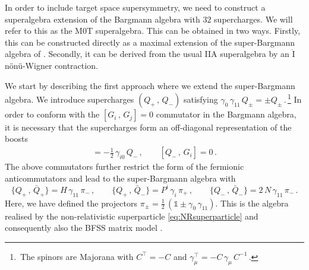 \documentclass[11pt]{article}
\newcommand{\be}{\begin{equation}}
\newcommand{\ee}{\end{equation}}
\begin{document}
In order to include target space supersymmetry, we need to construct a superalgebra extension of the Bargmann algebra with $32$ supercharges. We will refer to this as the M0T superalgebra.
This can be obtained in two ways.
Firstly, this can be constructed directly as a maximal extension of the super-Bargmann algebra of \cite{Gomis:2004pw}. 
Secondly, it can be derived from the usual IIA superalgebra by an $\dot{\text{I}}$n\"on\"u-Wigner contraction.

We start by describing the first approach where we extend the super-Bargmann algebra.
We introduce supercharges $(Q^{}_+\,, \, Q^{}_-)$ satisfying $\gamma^{}_0 \, \gamma^{}_{11} \, Q^{}_\pm = \pm Q^{}_\pm$\,.\,\footnote{\,The spinors are Majorana with $C^\intercal = -C$ and $\gamma_\mu^\intercal = -C \, \gamma^{}_\mu \, C^{-1}$\,. }
In order to conform with the $[G^{}_i\,, \, G^{}_j]=0$ commutator in the Bargmann algebra, it is necessary that the supercharges form an off-diagonal representation of the boosts
%
\begin{align}
    [Q^{}_+\,, \, G^{}_i] = -\tfrac{1}{2} \, \gamma^{}_{i0} \, Q^{}_-\,, 
        \qquad%
    [Q^{}_-\,, \, G^{}_i] = 0\,.
\end{align}
%
The above commutators further restrict the form of the fermionic anticommutators and lead to the super-Bargmann algebra with 
%
\be
    \{Q_+\,, \, \bar{Q}_+\} = H \, \gamma^{}_{11} \, \pi^{}_-\,, 
        \qquad%
    \{Q_+\,, \, \bar{Q}_-\} = P^i \, \gamma^{}_i \, \pi^{}_+\,,
        \qquad%
    \{Q_-\,, \, \bar{Q}_-\} = 2 \, N \, \gamma^{}_{11} \, \pi^{}_-\,.
\ee
%
Here, we have defined the projectors $\pi^{}_\pm = \tfrac12\,(\mathbb{1}\pm \gamma^{}_0 \, \gamma^{}_{11})$. This is the algebra realised by the non-relativistic superparticle \eqref{eq:NRsuperparticle} and consequently also the BFSS matrix model \cite{Banks:1996vh, Gomis:2004pw}. 
\end{document}

